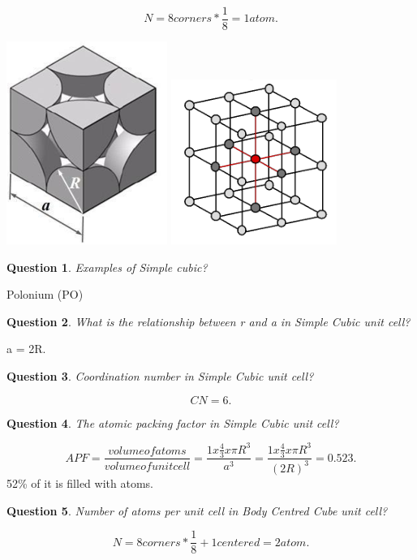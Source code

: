 \documentclass[13]{article}
\newtheorem{exer}{Question}
\begin{document}
\[
N = 8 corners * \frac{1}{8} = 1 atom 
.\]
\begin{center}
\includegraphics[scale=0.5]{figures/6.png} \includegraphics[scale=0.5]{figures/7.png}
\end{center}
\begin{exer}
Examples of Simple cubic?
\end{exer}
Polonium (PO)
\begin{exer}
What is the relationship between r and a in Simple Cubic unit cell?
\end{exer}
a = 2R.
\begin{exer}
Coordination number in Simple Cubic unit cell?
\end{exer}
\[
CN=6
.\] 
\begin{exer}
The atomic packing factor in Simple Cubic unit cell?
\end{exer}
\[
	APF = \frac{volume of atoms}{volume of unit cell} = \frac{1x \frac{4}{3} x \pi R^3}{a^3}= \frac{1x \frac{4}{3} x \pi R^3}{(2R)^3} = 0.523
.\] 
52\% of it is filled with atoms. 
\begin{exer}
Number of atoms per unit cell in Body Centred Cube unit cell?
\end{exer}
\[
N = 8 corners * \frac{1}{8} + 1 centered = 2 atom 
.\]
\end{document}
